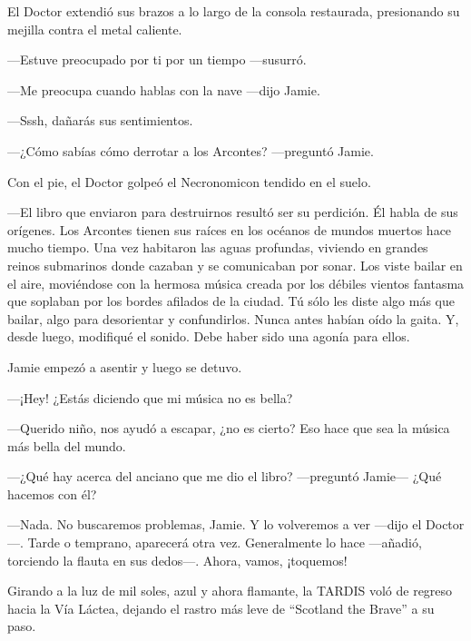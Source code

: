 El Doctor extendió sus brazos a lo largo de la consola restaurada,
presionando su mejilla contra el metal caliente. 

---Estuve preocupado por ti por un tiempo ---susurró.

---Me preocupa cuando hablas con la nave ---dijo Jamie.

---Sssh, dañarás sus sentimientos.

---¿Cómo sabías cómo derrotar a los Arcontes? ---preguntó Jamie.

Con el pie, el Doctor golpeó el Necronomicon tendido en el suelo. 

---El libro que enviaron para destruirnos resultó ser su perdición. Él
habla de sus orígenes. Los Arcontes tienen sus raíces en los océanos de
mundos muertos hace mucho tiempo. Una vez habitaron las aguas profundas,
viviendo en grandes reinos submarinos donde cazaban y se comunicaban por
sonar. Los viste bailar en el aire, moviéndose con la hermosa música
creada por los débiles vientos fantasma que soplaban por los bordes
afilados de la ciudad. Tú sólo les diste algo más que bailar, algo para
desorientar y confundirlos. Nunca antes habían oído la gaita. Y, desde
luego, modifiqué el sonido. Debe haber sido una agonía para ellos.

Jamie empezó a asentir y luego se detuvo. 

---¡Hey! ¿Estás diciendo que mi música no es bella?

---Querido niño, nos ayudó a escapar, ¿no es cierto? Eso hace que sea la
música más bella del mundo.

---¿Qué hay acerca del anciano que me dio el libro? ---preguntó Jamie---
¿Qué hacemos con él?

---Nada. No buscaremos problemas, Jamie. Y lo volveremos a ver ---dijo
el Doctor---. Tarde o temprano, aparecerá otra vez. Generalmente lo
hace ---añadió, torciendo la flauta en sus dedos---. Ahora,
vamos, ¡toquemos!

Girando a la luz de mil soles, azul y ahora flamante, la TARDIS voló de
regreso hacia la Vía Láctea, dejando el rastro más leve de ``Scotland
the Brave'' a su paso.